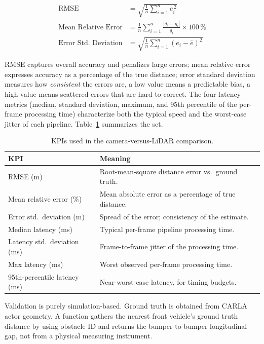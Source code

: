 \documentclass[12pt, a4paper]{report}
\begin{document}
\begin{align}
\text{RMSE} &= \sqrt{\frac{1}{n}\sum_{i=1}^{n} e_i^{\,2}} \\
\text{Mean Relative Error} &= \frac{1}{n}\sum_{i=1}^{n}
   \frac{|d_i - g_i|}{g_i}\times 100\,\% \\
\text{Error Std.\ Deviation} &= \sqrt{\frac{1}{n}\sum_{i=1}^{n}(e_i-\bar{e})^2}
\end{align}

RMSE captures overall accuracy and penalizes large errors; mean relative error
expresses accuracy as a percentage of the true distance; error standard
deviation measures how \emph{consistent} the errors are, a low value means a
predictable bias, a high value means scattered errors that are hard to correct.
The four latency metrics (median, standard deviation, maximum, and 95th
percentile of the per-frame processing time) characterize both the typical speed
and the worst-case jitter of each pipeline. Table~\ref{tab:kpis} summarizes the
set.

\begin{table}[H]
\centering
\caption{KPIs used in the camera-versus-LiDAR comparison.}
\label{tab:kpis}
\begin{tabular}{@{}p{}p{}@{}}
\toprule
\textbf{KPI} & \textbf{Meaning} \\
\midrule
RMSE (m)                      & Root-mean-square distance error vs.\ ground truth. \\
Mean relative error (\%)      & Mean absolute error as a percentage of true distance. \\
Error std.\ deviation (m)     & Spread of the error; consistency of the estimate. \\
Median latency (ms)           & Typical per-frame pipeline processing time. \\
Latency std.\ deviation (ms)  & Frame-to-frame jitter of the processing time. \\
Max latency (ms)              & Worst observed per-frame processing time. \\
95th-percentile latency (ms)  & Near-worst-case latency, for timing budgets. \\
\bottomrule
\end{tabular}
\end{table}


Validation is purely simulation-based. Ground truth is obtained from
CARLA actor geometry. A function gathers the nearest front vehicle's ground truth 
distance by using obstacle ID and returns the
bumper-to-bumper longitudinal gap, not from a physical measuring instrument.
\end{document}
